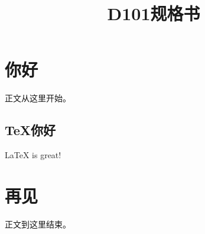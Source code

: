\documentclass{slfartcn}
\begin{document}
\title{D101规格书}                %
\subtitle{}             %

\author{}               %
\maketitle

\begin{abstract}         %
\end{abstract}

\begin{revisions} %
\end{revisions}

\frontmatter            %

\mainmatter
\section{你好}
正文从这里开始。

\subsection{\TeX 你好}
\LaTeX\cite{oetiker1995not} is great!
\section{再见}
正文到这里结束。

\appendix


\backmatter
\end{document}
